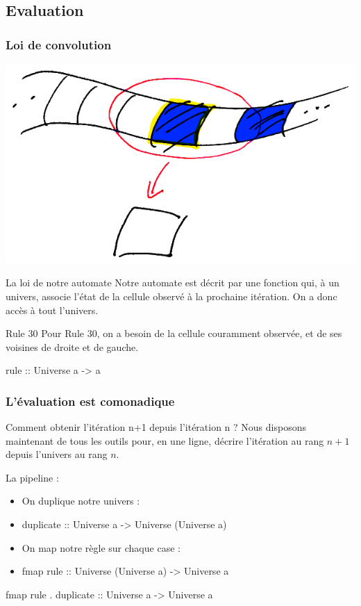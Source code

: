 \documentclass{beamer}
\begin{document}
\subsection{Evaluation}

\begin{frame}
\frametitle{Loi de convolution}
\begin{center}
\includegraphics[scale=0.15]{ribbon_convo.png}
\end{center}
\begin{block}{La loi de notre automate}
Notre automate est décrit par une fonction qui, à un univers, associe l'état de la cellule observé à la prochaine itération. On a donc accès à tout l'univers.
\end{block}
\pause
\begin{block}{Rule 30}
Pour Rule 30, on a besoin de la cellule couramment observée, et de ses voisines de droite et de gauche.
\end{block}
\pause
\begin{exampleblock}{}
rule :: Universe a -> a
\end{exampleblock}
\end{frame}

\begin{frame}
\frametitle{L'évaluation est comonadique}
\begin{alertblock}{Comment obtenir l'itération n+1 depuis l'itération n ?}
Nous disposons maintenant de tous les outils pour, en une ligne, décrire l'itération au rang $n+1$ depuis l'univers au rang $n$.
\end{alertblock}
\pause
\begin{block}{La pipeline :}
\begin{itemize}
\item On duplique notre univers :
\item[] duplicate :: Universe a -> Universe (Universe a)
\item On map notre règle sur chaque case :
\item[] fmap rule :: Universe (Universe a) -> Universe a
\end{itemize}
\pause
\end{block}
\begin{exampleblock}{}
fmap rule . duplicate :: Universe a -> Universe a
\end{exampleblock}
\end{frame}
\end{document}
